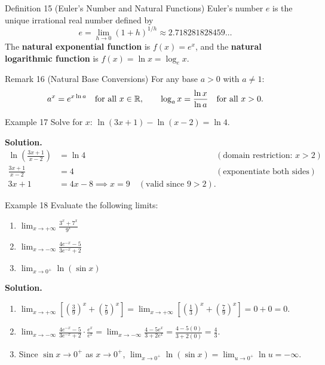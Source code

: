 \begin{definitionbox}{Definition 15 (Euler's Number and Natural Functions)}
Euler's number \(e\) is the unique irrational real number defined by
\[
e = \lim_{h \to 0} (1 + h)^{1/h} \approx 2.718281828459\dots
\]
The \textbf{natural exponential function} is \(f(x) = e^{x}\), and the \textbf{natural logarithmic function} is \(f(x) = \ln x = \log_e x\).
\end{definitionbox}

\begin{remarkbox}{Remark 16 (Natural Base Conversions)}
For any base \(a > 0\) with \(a \neq 1\):
\[
a^{x} = e^{x \ln a} \quad \text{for all } x \in \mathbb{R}, \qquad \log_a x = \frac{\ln x}{\ln a} \quad \text{for all } x > 0.
\]
\end{remarkbox}

\begin{examplebox}{Example 17}
Solve for \(x\): \(\ln(3x + 1) - \ln(x - 2) = \ln 4\).

\medskip
\textbf{Solution.}
\begin{align*}
\ln\!\left(\frac{3x + 1}{x - 2}\right) &= \ln 4 && (\text{domain restriction: } x > 2) \\[4pt]
\frac{3x + 1}{x - 2} &= 4 && (\text{exponentiate both sides}) \\[4pt]
3x + 1 &= 4x - 8 \implies x = 9 \quad (\text{valid since } 9 > 2).
\end{align*}
\end{examplebox}

\begin{examplebox}{Example 18}
Evaluate the following limits:
\begin{enumerate}
    \item \(\displaystyle\lim_{x \to +\infty} \frac{3^x + 7^x}{9^x}\)
    \item \(\displaystyle\lim_{x \to -\infty} \frac{4e^{-x} - 5}{3e^{-x} + 2}\)
    \item \(\displaystyle\lim_{x \to 0^+} \ln(\sin x)\)
\end{enumerate}

\medskip
\textbf{Solution.}
\begin{enumerate}
    \item \(\displaystyle\lim_{x \to +\infty} \left[ \left(\frac{3}{9}\right)^{\!x} + \left(\frac{7}{9}\right)^{\!x} \right] = \lim_{x \to +\infty} \left[ \left(\frac{1}{3}\right)^{\!x} + \left(\frac{7}{9}\right)^{\!x} \right] = 0 + 0 = 0\).
    \item \(\displaystyle\lim_{x \to -\infty} \frac{4e^{-x} - 5}{3e^{-x} + 2} \cdot \frac{e^x}{e^x} = \lim_{x \to -\infty} \frac{4 - 5e^x}{3 + 2e^x} = \frac{4 - 5(0)}{3 + 2(0)} = \frac{4}{3}\).
    \item Since \(\sin x \to 0^+\) as \(x \to 0^+\), \(\displaystyle\lim_{x \to 0^+} \ln(\sin x) = \lim_{u \to 0^+} \ln u = -\infty\).
\end{enumerate}
\end{examplebox}

